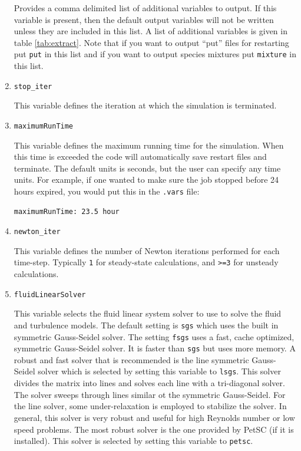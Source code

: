 \documentclass{article}
\begin{document}
\begin{enumerate}
  Provides a comma delimited list of additional variables to output.
  If this variable is present, then the default output variables
  will not be written unless they are included in this list.  A list
  of additional variables is given in table
  \ref{tab:extract}. %
  Note that if you
  want to output ``put'' files for restarting put {\tt put} in this
  list and if you want to output species mixtures put {\tt mixture} in
  this list.

\item {\tt stop\_iter}

  This variable defines the iteration at which the simulation is terminated.

\item {\tt maximumRunTime}

  This variable defines the maximum running time for the
  simulation.  When this time is exceeded the code will automatically
  save restart files and terminate.  The default units
  is seconds, but the user can specify any time units.  For
  example, if one wanted to make sure the job stopped before 24 hours
  expired, you would put this in the {\tt .vars} file:
\begin{verbatim}
maximumRunTime: 23.5 hour
\end{verbatim}

\item {\tt newton\_iter}
  
  This variable defines the number of Newton iterations performed
  for each time-step.  Typically {\tt 1} for steady-state calculations,
  and {\tt >=3} for unsteady calculations.

\item {\tt fluidLinearSolver }

  This variable selects the fluid linear system solver to use to solve
  the fluid and turbulence models.  The default setting is {\tt sgs}
  which uses the built in symmetric Gauss-Seidel solver.  The setting
  {\tt fsgs} uses a fast, cache optimized, symmetric Gauss-Seidel
  solver.  It is faster than {\tt sgs} but uses more memory.  A robust
  and fast solver that is recommended is the line symmetric
  Gauss-Seidel solver which is selected by setting this variable to
  {\tt lsgs}.  This solver divides the matrix into lines and solves
  each line with a tri-diagonal solver.  The solver sweeps through
  lines similar ot the symmetric Gauss-Seidel.  For the line solver,
  some under-relaxation is employed to stabilize the solver.  In general,
  this solver is very robust and useful for high Reynolds number or
  low speed problems.  The most robust solver is the one provided by
  PetSC (if it is installed).  This solver is selected by setting this
  variable to {\tt petsc}.


\end{enumerate}
\end{document}
